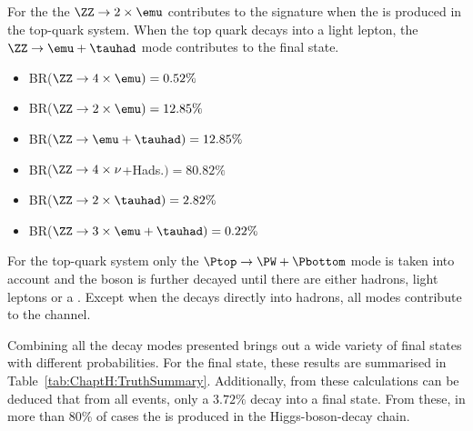 For the \ZZ the $\ZZ \rightarrow 2 \times \emu$ contributes 
to the \dileptau signature when the \tauhad is produced in the
top-quark system. When the top quark decays into a 
light lepton, the $\ZZ \rightarrow \emu + \tauhad$ mode contributes
to the \dileptau final state.
\begin{itemize}
	\item  BR($\ZZ \rightarrow 4 \times \emu)= 0.52\%$ 
	\item  BR($\ZZ \rightarrow 2 \times \emu)= 12.85\%$
	\item  BR($\ZZ \rightarrow \emu +\tauhad)= 12.85\%$
	\item  BR($\ZZ \rightarrow 4 \times \nu$+Hads.$)= 80.82\%$
	\item  BR($\ZZ \rightarrow 2 \times \tauhad)= 2.82\%$	
	\item  BR($\ZZ \rightarrow 3 \times \emu + \tauhad)= 0.22\%$
\end{itemize}


For the top-quark system only the $\Ptop \rightarrow \PW + \Pbottom$
mode is taken into account and the \PW boson is further decayed until there are
either hadrons, light leptons or a \tauhad. Except when the \PW decays directly
into hadrons, all modes contribute to the \dileptau channel.


Combining all the decay modes presented brings out a wide variety of final states 
with different probabilities. For the \dileptau final state, these results are summarised in
Table~\ref{tab:ChaptH:TruthSummary}. %
Additionally, from these calculations can be deduced that from all \tHq events, only
a $3.72\%$ decay into a \dileptau final state. %
From these, in more than 80\% of cases the \tauhad is produced in
the Higgs-boson-decay chain.


	





